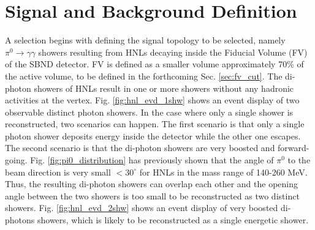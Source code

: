 \clearpage

\section{Signal and Background Definition}
\label{sec:sig_bkg_def}

A selection begins with defining the signal topology to be selected, namely $\pi^0 \rightarrow \gamma\gamma$ showers resulting from HNLs decaying inside the Fiducial Volume (FV) of the SBND detector.
FV is defined as a smaller volume approximately 70\% of the active volume, to be defined in the forthcoming Sec. \ref{sec:fv_cut}.
The di-photon showers of HNLs result in one or more showers without any hadronic activities at the vertex.
Fig. \ref{fig:hnl_evd_1shw} shows an event display of two observable distinct photon showers.  
In the case where only a single shower is reconstructed, two scenarios can happen.
The first scenario is that only a single photon shower deposits energy inside the detector while the other one escapes.
The second scenario is that the di-photon showers are very boosted and forward-going.
Fig. \ref{fig:pi0_distribution} has previously shown that the angle of $\pi^0$ to the beam direction is very small $< 30^\circ$ for HNLs in the mass range of 140-260 MeV.
Thus, the resulting di-photon showers can overlap each other and the opening angle between the two showers is too small to be reconstructed as two distinct showers. 
Fig. \ref{fig:hnl_evd_2shw} shows an event display of very boosted di-photons showers, which is likely to be reconstructed as a single energetic shower.

